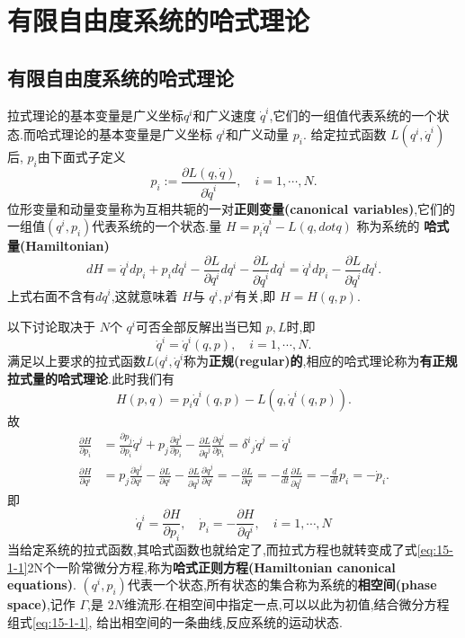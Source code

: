 \documentclass[../main.tex]{subfiles}
\begin{document}
\section{有限自由度系统的哈式理论}
\subsection{有限自由度系统的哈式理论}
拉式理论的基本变量是广义坐标$q^i$和广义速度 $\dot{q}^i$,它们的一组值代表系统的一个状态.而哈式理论的基本变量是广义坐标 $q^i$和广义动量 $p_i$.
给定拉式函数 $L(q^i,\dot{q}^i)$后, $p_i$由下面式子定义 \[
  p_i := \frac{\partial L(q,\dot{q})}{\partial  \dot{q}^i}, \quad i = 1, \cdots , N 
.\] 
位形变量和动量变量称为互相共轭的一对\textbf{正则变量(canonical variables)},它们的一组值$(q^i,p_i)$代表系统的一个状态.量 $H = p_i\dot{q}^i - L(q,dot{q})$
称为系统的 \textbf{哈式量(Hamiltonian)} \[
  dH = \dot{q}^i dp_i + p_i d\dot{q}^i - \frac{\partial L}{\partial q^i}dq^i - \frac{\partial L}{\partial \dot{q}^i}d\dot{q}^i =\dot{q}^i dp_i-\frac{\partial L}{\partial \dot{q}^i}d\dot{q}^i
.\] 
上式右面不含有$d\dot{q}^i$,这就意味着 $H$与 $q^i,p^i$有关,即 $H = H(q,p)$.

以下讨论取决于 $N$个 $q^i$可否全部反解出当已知 $p,L$时,即 \[
  \dot{q}^i = \dot{q}^i(q,p),\quad i= 1,\cdots ,N
.\] 
满足以上要求的拉式函数$L(q^i,\dot{q}^i$称为\textbf{正规(regular)的},相应的哈式理论称为\textbf{有正规拉式量的哈式理论}.此时我们有 \[
H(p,q) = p_i\dot{q}^i(q,p) - L(q,\dot{q}^i(q,p))
.\] 
故
\begin{align*}
  \frac{\partial H}{\partial p_i} &= \frac{\partial p_j}{\partial p_i}\dot{q}^j + p_j \frac{\partial \dot{q}^j}{\partial p_i} - \frac{\partial L}{\partial \dot{q}^j} \frac{\partial \dot{q}^j}{\partial p_i} = \delta^{i}{}_{j}\dot{q}^j= \dot{q}^i\\
  \frac{\partial H}{\partial q^i}& = p_j \frac{\partial \dot{q}^j}{\partial q^i} - \frac{\partial L}{\partial q^i} - \frac{\partial L}{\partial \dot{q}^j}\frac{\partial \dot{q}^j}{\partial q^i} = -\frac{\partial L}{\partial q^i} = - \frac{d}{dt} \frac{\partial L}{\partial \dot{q}^i} = -\frac{d}{dt}p_i = -\dot{p}_i
.\end{align*}
即
\begin{equation}
  \label{eq:15-1-1}
  \dot{q}^i = \frac{\partial H}{\partial p_i},\quad \dot{p}_i = -\frac{\partial H}{\partial q^i}, \quad i = 1,\cdots , N   
\end{equation}
当给定系统的拉式函数,其哈式函数也就给定了,而拉式方程也就转变成了式\ref{eq:15-1-1}2N个一阶常微分方程,称为\textbf{哈式正则方程(Hamiltonian canonical equations)}.
$(q^i,p_i)$代表一个状态,所有状态的集合称为系统的\textbf{相空间(phase space)},记作 $\Gamma$,是 $2N$维流形.在相空间中指定一点,可以以此为初值,结合微分方程组式\ref{eq:15-1-1},
给出相空间的一条曲线,反应系统的运动状态.
\end{document}
